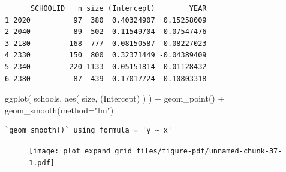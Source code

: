 \documentclass[
  letterpaper,
  DIV=11,
  numbers=noendperiod]{scrreprt}
\newenvironment{Shaded}{\begin{snugshade}}{\end{snugshade}}
\newcommand{\AttributeTok}[1]{\textcolor[rgb]{0.49,0.56,0.16}{#1}}
\newcommand{\DecValTok}[1]{\textcolor[rgb]{0.25,0.63,0.44}{#1}}
\newcommand{\FunctionTok}[1]{\textcolor[rgb]{0.02,0.16,0.49}{#1}}
\newcommand{\NormalTok}[1]{\textcolor[rgb]{0.00,0.44,0.13}{#1}}
\newcommand{\OtherTok}[1]{\textcolor[rgb]{0.00,0.44,0.13}{#1}}
\newcommand{\SpecialCharTok}[1]{\textcolor[rgb]{0.25,0.44,0.63}{#1}}
\newcommand{\StringTok}[1]{\textcolor[rgb]{0.25,0.44,0.63}{#1}}
\begin{document}
\begin{Shaded}
\end{Shaded}

\begin{verbatim}
      SCHOOLID   n size (Intercept)        YEAR
1 2020          97  380  0.40324907  0.15258009
2 2040          89  502  0.11549704  0.07547476
3 2180         168  777 -0.08150587 -0.08227023
4 2330         150  800  0.32371449 -0.04389409
5 2340         220 1133 -0.05151814 -0.01128432
6 2380          87  439 -0.17017724  0.10803318
\end{verbatim}

\begin{Shaded}
\begin{Highlighting}[]
\FunctionTok{ggplot}\NormalTok{( schools, }\FunctionTok{aes}\NormalTok{( size, }\StringTok{\textasciigrave{}}\AttributeTok{(Intercept)}\StringTok{\textasciigrave{}}\NormalTok{ ) ) }\SpecialCharTok{+}
  \FunctionTok{geom\_point}\NormalTok{() }\SpecialCharTok{+}
  \FunctionTok{geom\_smooth}\NormalTok{(}\AttributeTok{method=}\StringTok{"lm"}\NormalTok{)}
\end{Highlighting}
\end{Shaded}

\begin{verbatim}
`geom_smooth()` using formula = 'y ~ x'
\end{verbatim}

\begin{figure}[H]

{\centering \texttt{[image: plot\_expand\_grid\_files/figure-pdf/unnamed-chunk-37-1.pdf]}

}

\end{figure}
\end{document}
